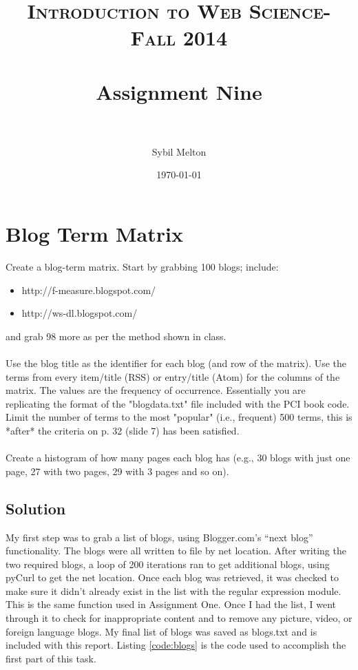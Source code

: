 \documentclass[paper=a4, fontsize=11pt]{scrartcl} %
\title{	
\normalfont \normalsize 
\textsc{Introduction to Web Science- Fall 2014} \\ [25pt] %
\horrule{0.5pt} \\[0.4cm] %
\huge Assignment Nine \\ %
\horrule{2pt} \\[0.5cm] %
}
\author{Sybil Melton} %
\date{\normalsize\today} %
\numberwithin{equation}{section} %
\numberwithin{figure}{section} %
\numberwithin{table}{section} %
\begin{document}
\maketitle %
\newpage
\tableofcontents
\lstlistoflistings
\newpage

\section{Blog Term Matrix}
Create a blog-term matrix.  Start by grabbing 100 blogs; include:

\begin{itemize}
\item http://f-measure.blogspot.com/
\item http://ws-dl.blogspot.com/ 
\end{itemize}

and grab 98 more as per the method shown in class.\\ \\
Use the blog title as the identifier for each blog (and row of the
matrix).  Use the terms from every item/title (RSS) or entry/title
(Atom) for the columns of the matrix.  The values are the frequency
of occurrence.  Essentially you are replicating the format of the
"blogdata.txt" file included with the PCI book code.  Limit the
number of terms to the most "popular" (i.e., frequent) 500 terms,
this is *after* the criteria on p. 32 (slide 7) has been satisfied.\\ \\
Create a histogram of how many pages each blog has (e.g., 30
blogs with just one page, 27 with two pages, 29 with 3 pages and 
so on).  

\subsection{Solution}
My first step was to grab a list of blogs, using Blogger.com's ``next blog'' functionality.
The blogs were all written to file by net location.
After writing the two required blogs, a loop of 200 iterations ran to get additional blogs, using pyCurl to get the net location. \cite{bib:pycurl}
Once each blog was retrieved, it was checked to make sure it didn't already exist in the list with the regular expression module.
This is the same function used in Assignment One. \cite{bib:re}
Once I had the list, I went through it to check for inappropriate content and to remove any picture, video, or foreign language blogs.
My final list of blogs was saved as blogs.txt and is included with this report.
Listing \ref{code:blogs} is the code used to accomplish the first part of this task.\\
\end{document}

